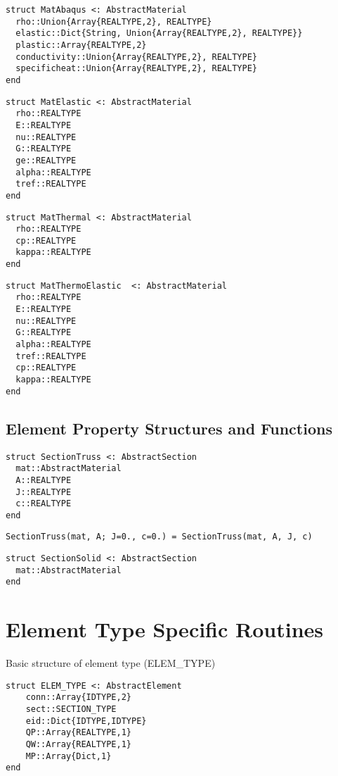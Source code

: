 \documentclass[11pt]{article} %
\begin{document}
\begin{verbatim}
struct MatAbaqus <: AbstractMaterial
  rho::Union{Array{REALTYPE,2}, REALTYPE}
  elastic::Dict{String, Union{Array{REALTYPE,2}, REALTYPE}}
  plastic::Array{REALTYPE,2}
  conductivity::Union{Array{REALTYPE,2}, REALTYPE}
  specificheat::Union{Array{REALTYPE,2}, REALTYPE}
end  
\end{verbatim}

\begin{verbatim}
struct MatElastic <: AbstractMaterial
  rho::REALTYPE
  E::REALTYPE
  nu::REALTYPE
  G::REALTYPE
  ge::REALTYPE
  alpha::REALTYPE
  tref::REALTYPE
end
\end{verbatim}

\begin{verbatim}
struct MatThermal <: AbstractMaterial
  rho::REALTYPE
  cp::REALTYPE
  kappa::REALTYPE
end
\end{verbatim}

\begin{verbatim}
struct MatThermoElastic  <: AbstractMaterial
  rho::REALTYPE
  E::REALTYPE
  nu::REALTYPE
  G::REALTYPE
  alpha::REALTYPE
  tref::REALTYPE
  cp::REALTYPE
  kappa::REALTYPE
end
\end{verbatim}

\subsection{Element Property  Structures and Functions}
\begin{verbatim}
struct SectionTruss <: AbstractSection
  mat::AbstractMaterial
  A::REALTYPE
  J::REALTYPE
  c::REALTYPE
end
\end{verbatim}

\texttt{SectionTruss(mat, A; J=0., c=0.) = SectionTruss(mat, A, J, c)}

\begin{verbatim}
struct SectionSolid <: AbstractSection
  mat::AbstractMaterial
end
\end{verbatim}

\section{Element Type Specific Routines}

Basic structure of element type (ELEM\_TYPE)
\begin{verbatim}
struct ELEM_TYPE <: AbstractElement
	conn::Array{IDTYPE,2}
	sect::SECTION_TYPE
	eid::Dict{IDTYPE,IDTYPE}
	QP::Array{REALTYPE,1}
	QW::Array{REALTYPE,1}
	MP::Array{Dict,1}
end
\end{verbatim}
\end{document}
